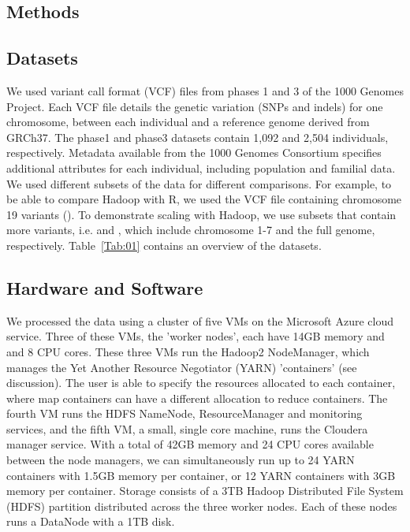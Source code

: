 \documentclass{bioinfo}
\begin{document}


\begin{methods}
\section{Methods}
\subsection*{Datasets}
We used variant call format (VCF) files from phases 1 and 3 of the 1000 Genomes Project.
Each VCF file details the genetic variation (SNPs and indels) for one chromosome, between each individual and a reference genome derived from GRCh37. 
The phase1 and phase3 datasets contain 1,092 and 2,504 individuals, respectively.
Metadata available from the 1000 Genomes Consortium specifies additional attributes for each individual, including population and familial data.\\
We used different subsets of the data for different comparisons. For example, to be able to compare Hadoop with R, we used the VCF file containing chromosome 19 variants (\NinteenPhaseone{}).
To demonstrate scaling with Hadoop, we use subsets that contain more variants, i.e. \SevenPhaseone{} and \FullPhaseone{}, which include chromosome 1-7 and the full genome, respectively.
Table~\ref{Tab:01} contains an overview of the datasets.

\subsection*{Hardware and Software}
We processed the data using a cluster of five VMs on the Microsoft Azure cloud service. Three of these VMs, the 'worker nodes', each have 14GB memory and and 8 CPU cores. These three VMs run the Hadoop2 NodeManager, which manages the Yet Another Resource Negotiator (YARN) 'containers' (see discussion).
The user is able to specify the resources allocated to each container, where map containers can have a different allocation to reduce containers.
The fourth VM runs the HDFS NameNode, ResourceManager and monitoring services, and the fifth VM, a small, single core machine, runs the Cloudera manager service.
With a total of 42GB memory and 24 CPU cores available between the node managers, we can simultaneously run up to 24 YARN containers with 1.5GB memory per container, or 12 YARN containers with 3GB memory per container.
Storage consists of a 3TB Hadoop Distributed File System (HDFS) partition distributed across the three worker nodes. Each of these nodes runs a DataNode with a 1TB disk.


\end{methods}
\end{document}
